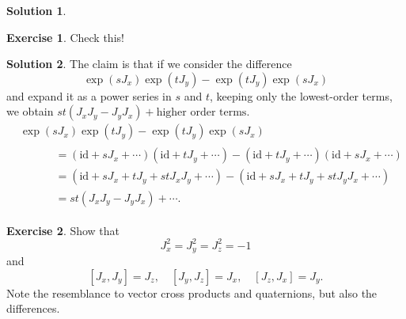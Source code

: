 \documentclass[11pt, a4paper]{report}
\theoremstyle{definition}
\newtheorem{ex}{Exercise}[part]
\newtheorem{sol}{Solution}[part]
\begin{document}
\begin{sol}

\end{sol}

\begin{ex}

Check this!

\end{ex}

\begin{sol}

The claim is that if we consider the difference
\[
    \exp(s J_x) \exp(t J_y) - \exp(t J_y) \exp(s J_x)
\]
and expand it as a power series in $s$ and $t$, keeping only the lowest-order terms, we obtain $st(J_x J_y - J_y J_x) + \text{higher order terms}$.
\begin{align*}
    &\exp(s J_x) \exp(t J_y) - \exp(t J_y) \exp(s J_x) \\
    &\qquad\begin{aligned}
        &= (\text{id} + sJ_x + \cdots) (\text{id} + tJ_y + \cdots)
           - (\text{id} + tJ_y + \cdots) (\text{id} + sJ_x + \cdots) \\
        &= (\text{id} + sJ_x + tJ_y + st J_x J_y + \cdots)
           - (\text{id} + sJ_x + tJ_y + st J_y J_x + \cdots) \\
        &= st(J_x J_y - J_y J_x) + \cdots.
    \end{aligned}
\end{align*}

\end{sol}

\begin{ex}

Show that
\[
    J_x^2 = J_y^2 = J_z^2 = -1
\]
and
\[
    [J_x, J_y] = J_z, \quad
    [J_y, J_z] = J_x, \quad
    [J_z, J_x] = J_y.
\]
Note the resemblance to vector cross products and quaternions, but also the differences.

\end{ex}
\end{document}

